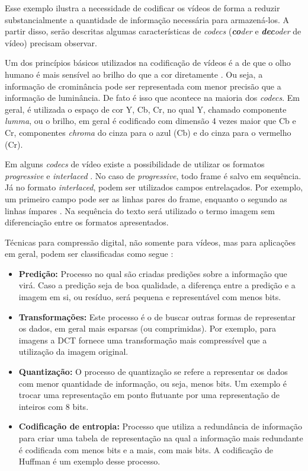 \documentclass[cic,tc]{iiufrgs}
\begin{document}
Esse exemplo ilustra a necessidade de codificar os vídeos de forma a
reduzir substancialmente a quantidade de informação necessária para armazená-los.
A partir disso, serão descritas algumas características de \textit{codecs} 
(\emph{\textbf{co}der} e \emph{\textbf{dec}oder} de vídeo) precisam observar.

Um dos princípios básicos utilizados na codificação de vídeos é a de que o olho humano
é mais sensível ao brilho do que a cor diretamente \cite{SullivanH264}.
Ou seja, a informação de crominância pode ser representada com menor precisão que 
a informação de luminância.
De fato é isso que acontece na maioria dos \emph{codecs}. 
Em geral, é utilizada o espaço de cor Y, Cb, Cr, no qual Y, chamado componente \emph{lumma},
ou o brilho, em geral é codificado com dimensão 4 vezes maior que Cb e Cr, componentes 
\emph{chroma} do cinza para o azul (Cb) e do cinza para o vermelho (Cr).

Em alguns \emph{codecs} de vídeo existe a possibilidade de utilizar os formatos
\emph{progressive} e \emph{interlaced} \cite{SullivanH264}.
No caso de \emph{progressive}, todo frame é salvo em sequência.
Já no formato \emph{interlaced}, podem ser utilizados campos entrelaçados.
Por exemplo, um primeiro campo pode ser as linhas pares do frame, enquanto o segundo
as linhas ímpares \cite{SullivanH264}.
Na sequência do texto será utilizado o termo imagem sem diferenciação entre os 
formatos apresentados.

Técnicas para compressão digital, não somente para vídeos, mas para aplicações em geral,
podem ser classificadas como segue \cite{SullivanH264}:
\begin{itemize}
    \item \textbf{Predição:} Processo no qual são criadas predições sobre a informação 
    que virá. Caso a predição seja de boa qualidade, a diferença entre a predição e a 
    imagem em si, ou resíduo, será pequena e representável com menos bits.
    \item \textbf{Transformações:} Este processo é o de buscar outras formas de representar
    os dados, em geral mais esparsas (ou comprimidas). Por exemplo, para imagens a DCT 
    fornece uma transformação mais compressível que a utilização da imagem original.
    \item \textbf{Quantização:} O processo de quantização se refere a representar os dados
    com menor quantidade de informação, ou seja, menos bits. Um exemplo é trocar uma representação 
    em ponto flutuante por uma representação de inteiros com 8 bits.
    \item \textbf{Codificação de entropia:} Processo que utiliza a redundância de informação para 
    criar uma tabela de representação na qual a informação mais redundante é codificada
    com menos bits e a mais, com mais bits. A codificação de Huffman é um exemplo desse processo.
\end{itemize}
\end{document}
